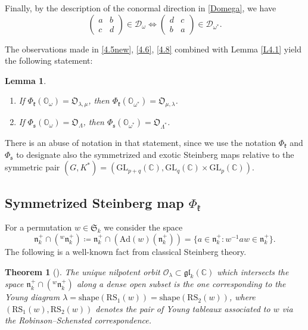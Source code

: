 \documentclass[11pt]{article}
\newtheorem{theorem}[theo]{Theorem}
\newtheorem{lemma}[theo]{Lemma}
\theoremstyle{definition}
\numberwithin{equation}{section}
\newcommand{\fk}{\mathfrak{k}}
\newcommand{\fs}{\mathfrak{s}}
\newcommand{\fn}{\mathfrak{n}}
\newcommand{\gl}{\mathfrak{gl}}
\newcommand{\RS}{\mathrm{RS}}
\newcommand{\shape}{\mathrm{shape}}
\newcommand{\Xorbit}{\mathbb{O}}
\newcommand{\Nkorbit}{\mathfrak{O}}
\newcommand{\Nsorbit}{\mathfrak{O}}
\newcommand{\condir}{\mathcal{D}}
\newcommand{\permutationsof}[1]{\mathfrak{S}_{#1}}
\newcommand{\GL}{\mathrm{GL}}
\newcommand{\mC}{\mathbb{C}}
\begin{document}
Finally, by the description of the conormal direction in \eqref{Domega}, we have
\begin{equation}
\label{4.8}
\begin{pmatrix} a & b\\ c & d \end{pmatrix}\in\condir_\omega\Longleftrightarrow
\begin{pmatrix} d & c\\ b & a \end{pmatrix}\in\condir_{\omega^*}.
\end{equation}

The observations made in \eqref{4.5new}, \eqref{4.6}, \eqref{4.8} combined with Lemma \ref{L4.1} yield the following statement:

\begin{lemma}
\label{L4.3}
\begin{enumerate}
\item If $\Phi_\fk(\Xorbit_\omega)=\Nkorbit_{\lambda,\mu}$, then $\Phi_\fk(\Xorbit_{\omega^*})=\Nkorbit_{\mu,\lambda}$.
\item If $\Phi_\fs(\Xorbit_\omega)=\Nsorbit_\Lambda$, then $\Phi_\fs(\Xorbit_{\omega^*})=\Nsorbit_{\Lambda^*}$.
\end{enumerate}
\end{lemma}

There is an abuse of notation in that statement, since we use the notation $\Phi_\fk$ and $\Phi_\fs$ to designate also the symmetrized and exotic Steinberg maps relative to the symmetric pair $(G,K^*)=(\GL_{p+q}(\mC),\GL_q(\mC)\times\GL_p(\mC))$.

\subsection{Symmetrized Steinberg map $\Phi_\fk$}

For a permutation $w\in\permutationsof{k}$ we consider the space
\[
\fn_k^+\cap({}^w\fn_k^+)\coloneqq \fn_k^+\cap(\mathrm{Ad}(w)(\fn_k^+))=\{a\in\fn_k^+:w^{-1}aw\in\fn_k^+\}.
\]
The following is a well-known fact from classical Steinberg theory.

\begin{theorem}[\cite{Steinberg-occurrence}]
\label{T-Steinberg}
The unique nilpotent orbit $\mathcal{O}_\lambda\subset \gl_k(\mC)$ which intersects the space $\fn_k^+\cap({}^w\fn_k^+)$ along a dense open subset is the one corresponding to the Young diagram
$\lambda=\shape(\RS_1(w))=\shape(\RS_2(w))$, where $(\RS_1(w),\RS_2(w))$ denotes the pair of Young tableaux associated to $w$ via the Robinson--Schensted correspondence.
\end{theorem}
\end{document}
